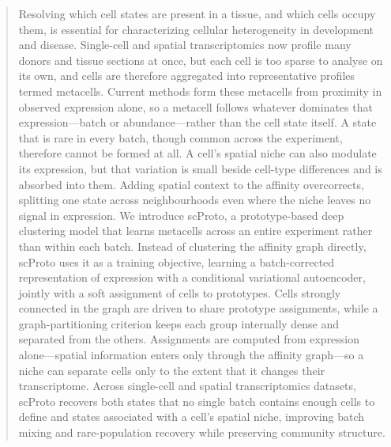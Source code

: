 \begin{abstract}
Resolving which cell states are present in a tissue, and which cells occupy them, is essential for characterizing cellular heterogeneity in development and disease. Single-cell and spatial transcriptomics now profile many donors and tissue sections at once, but each cell is too sparse to analyse on its own, and cells are therefore aggregated into representative profiles termed metacells. Current methods form these metacells from proximity in observed expression alone, so a metacell follows whatever dominates that expression---batch or abundance---rather than the cell state itself. A state that is rare in every batch, though common across the experiment, therefore cannot be formed at all. A cell's spatial niche can also modulate its expression, but that variation is small beside cell-type differences and is absorbed into them. Adding spatial context to the affinity overcorrects, splitting one state across neighbourhoods even where the niche leaves no signal in expression. We introduce scProto, a prototype-based deep clustering model that learns metacells across an entire experiment rather than within each batch. Instead of clustering the affinity graph directly, scProto uses it as a training objective, learning a batch-corrected representation of expression with a conditional variational autoencoder, jointly with a soft assignment of cells to prototypes. Cells strongly connected in the graph are driven to share prototype assignments, while a graph-partitioning criterion keeps each group internally dense and separated from the others. Assignments are computed from expression alone---spatial information enters only through the affinity graph---so a niche can separate cells only to the extent that it changes their transcriptome. Across single-cell and spatial transcriptomics datasets, scProto recovers both states that no single batch contains enough cells to define and states associated with a cell's spatial niche, improving batch mixing and rare-population recovery while preserving community structure.
\end{abstract}

